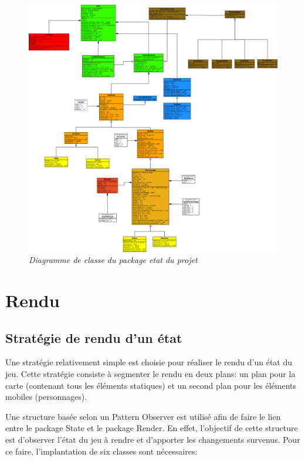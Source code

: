 \documentclass[11pt, a4paper]{article}
\begin{document}
\begin{figure}[H]
  \centering
  \includegraphics[scale=0.05]{img/state.png}
  \caption{\emph{Diagramme de classe du package etat du projet}}
\end{figure}

\section{Rendu}

\subsection{Stratégie de rendu d'un état}

Une stratégie relativement simple est choisie pour réaliser le rendu d’un état du jeu. Cette stratégie consiste à segmenter le rendu en deux plans: un plan pour la carte (contenant tous les éléments statiques) et un second plan pour les éléments mobiles (personnages).

	Une structure basée selon un Pattern Observer est utilisé afin de faire le lien entre le package State et le package Render. En effet, l’objectif de cette structure est d’observer l’état du jeu à rendre et d’apporter les changements survenus. Pour ce faire, l'implantation de six classes sont nécessaires:
\end{document}
